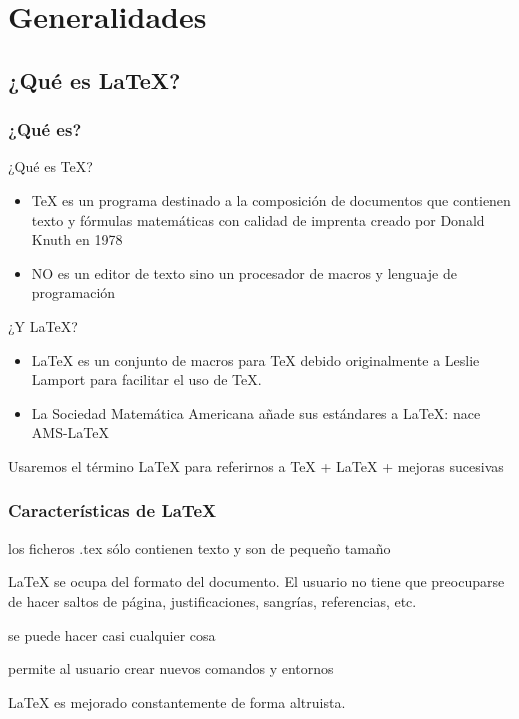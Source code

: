 \documentclass[10pt,xcolor=svgnames]{beamer}
\begin{document}
\section{Generalidades}

\subsection{¿Qué es \LaTeX?}

\begin{frame}
\frametitle{¿Qué es?}
	\begin{block}{¿Qué es \TeX?}
		\begin{itemize}
			\item \TeX{} es un programa destinado a la composición de documentos que contienen texto y fórmulas matemáticas con calidad de imprenta creado por Donald Knuth en 1978
			\item NO es un editor de texto sino un procesador de macros y lenguaje de programación
		\end{itemize}
	\end{block}
	\begin{block}{¿Y \LaTeX?}
		\begin{itemize}
			\item \LaTeX{} es un conjunto de macros para \TeX{}  debido originalmente a Leslie Lamport para facilitar el uso de \TeX.
			\item La Sociedad Matemática Americana añade sus estándares a \LaTeX{}: nace AMS-\LaTeX
		\end{itemize}
	\end{block}

	Usaremos el término \alert{\LaTeX{}} para referirnos a \TeX{} + \LaTeX{} + mejoras sucesivas
\end{frame}
 



\begin{frame}
\frametitle{Características de \LaTeX}
	\begin{description}[Transportabiilidad]
	\addtolength\itemsep{\fill}
		\item[Transportable] los ficheros .tex sólo contienen texto y son de pequeño tamaño 
		\item[WYSIWYM] \LaTeX{} se ocupa del formato del documento. El usuario no tiene que preocuparse de hacer saltos de página, justificaciones, sangrías, referencias, etc.
		\item[Versátil] se puede hacer casi cualquier cosa
		\item[Flexible] permite al usuario crear nuevos comandos y entornos 
		\item[Actualizado] \LaTeX{} es mejorado constantemente de forma altruista.
	\end{description}
\end{frame}
\end{document}
